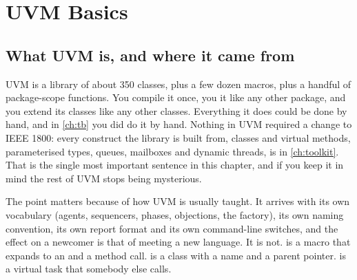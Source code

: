 \chapter{UVM Basics}
\label{ch:uvm}



\section{What UVM is, and where it came from}
\label{sec:uvm:what}

UVM is a library of about 350 \SV{} classes, plus a few dozen macros, plus a
handful of package-scope functions. You compile it once, you  it
like any other package, and you extend its classes like any other classes.
Everything it does could be done by hand, and in \cref{ch:tb} you did do it
by hand. Nothing in UVM required a change to IEEE 1800: every construct the
library is built from, classes and virtual methods, parameterised types,
queues, mailboxes and dynamic threads, is in \cref{ch:toolkit}. That is the
single most important sentence in this chapter, and if you keep it in mind the
rest of UVM stops being mysterious.

The point matters because of how UVM is usually taught. It arrives with its
own vocabulary (agents, sequencers, phases, objections, the factory), its own
naming convention, its own report format and its own command-line switches,
and the effect on a newcomer is that of meeting a new language. It is not.
 is a macro that expands to an  and a method call.
 is a class with a  name and a parent
pointer.  is a virtual task that somebody else calls.

